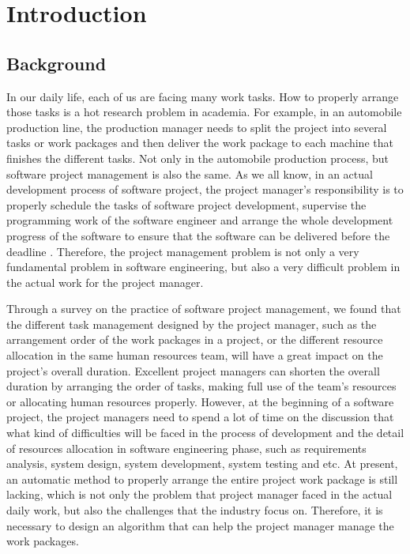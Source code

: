 
\section{Introduction}

\subsection{Background}
%
In our daily life, each of us are facing many work tasks.  How to properly 
arrange those tasks is a hot research problem in academia. For example, in an 
automobile production line, the production manager needs to split the project 
into several tasks or work packages and then deliver the work package to each 
machine that finishes the different tasks. Not only in the automobile 
production process, but software project management is also the same. As we 
all know, in an actual development process of software project, the project 
manager's responsibility is to properly schedule the tasks of software 
project development, supervise the programming work of the software engineer 
and arrange the whole development progress of the software to ensure that the 
software can be delivered before the deadline \cite{stellman}. Therefore, the 
project management problem is not only a very fundamental problem in software 
engineering, but also a very difficult problem in the actual work for the 
project manager.


Through a survey on the practice of software project management, we found 
that the different task management designed by the project manager, such as 
the arrangement order of the work packages in a project, or the different 
resource allocation in the same human resources team, will have a great 
impact on the project's overall duration. Excellent project managers can 
shorten the overall duration by arranging the order of tasks, making full use 
of the team’s resources or allocating human resources properly. However, at 
the beginning of a software project, the project managers need to spend a lot 
of time on the discussion that what kind of difficulties will be faced in the 
process of development and the detail of resources allocation in 
software engineering phase, such as requirements analysis, system design, 
system development, system testing and etc. At present, an automatic method 
to properly arrange the entire project work package is still lacking, which 
is not only the problem that project manager faced in the actual daily work, 
but also the challenges that the industry focus on. Therefore, it is 
necessary to design an algorithm that can help the project manager manage the 
work packages.


